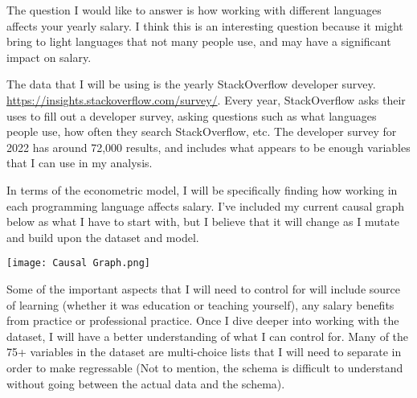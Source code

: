 \documentclass{article}
\begin{document}
  The question I would like to answer is how working with different languages affects your yearly salary. I think this is an interesting question because it might bring to light languages that not many people use, and may have a significant impact on salary.

  The data that I will be using is the yearly StackOverflow developer survey.
  \url{https://insights.stackoverflow.com/survey/}. Every year, StackOverflow asks their uses to fill out a developer survey, asking questions such as what languages people use, how often they search StackOverflow, etc. The developer survey for 2022 has around 72,000 results, and includes what appears to be enough variables that I can use in my analysis.

  In terms of the econometric model, I will be specifically finding how working in each programming language affects salary. I've included my current causal graph below as what I have to start with, but I believe that it will change as I mutate and build upon the dataset and model.

  \texttt{[image: Causal Graph.png]}

  Some of the important aspects that I will need to control for will include source of learning (whether it was education or teaching yourself), any salary benefits from practice or professional practice. Once I dive deeper into working with the dataset, I will have a better understanding of what I can control for. Many of the 75+ variables in the dataset are multi-choice lists that I will need to separate in order to make regressable (Not to mention, the schema is difficult to understand without going between the actual data and the schema).
\end{document}
